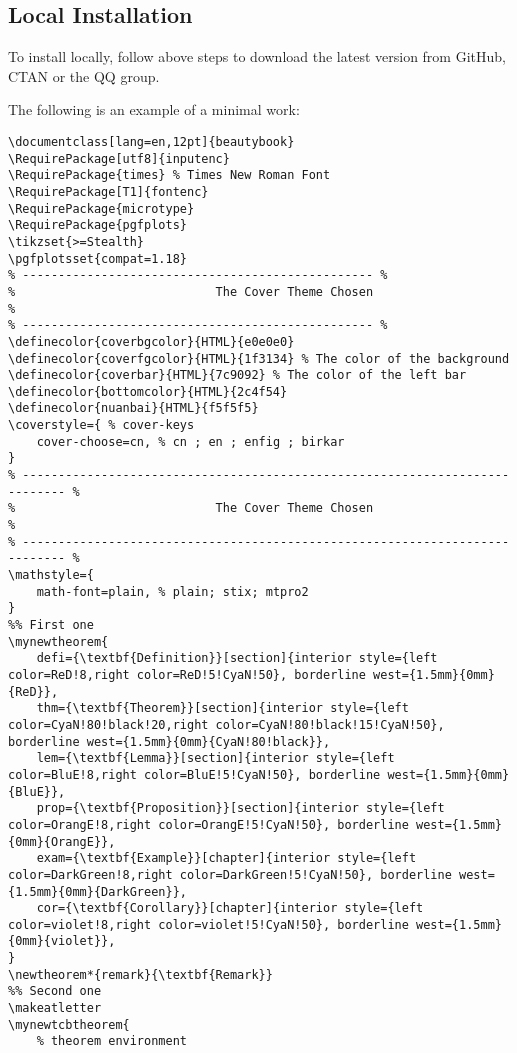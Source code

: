 \documentclass[lang=en,12pt]{beautybook}
\begin{document}
\subsection{Local Installation}

To install locally, follow above steps to download the latest version from GitHub, CTAN or the QQ group.

The following is an example of a minimal work:

\begin{lstlisting}
\documentclass[lang=en,12pt]{beautybook}
\RequirePackage[utf8]{inputenc}
\RequirePackage{times} % Times New Roman Font
\RequirePackage[T1]{fontenc}
\RequirePackage{microtype} 
\RequirePackage{pgfplots}
\tikzset{>=Stealth}
\pgfplotsset{compat=1.18}
% ------------------------------------------------- %
%                            The Cover Theme Chosen                            %
% ------------------------------------------------- %
\definecolor{coverbgcolor}{HTML}{e0e0e0}
\definecolor{coverfgcolor}{HTML}{1f3134} % The color of the background
\definecolor{coverbar}{HTML}{7c9092} % The color of the left bar
\definecolor{bottomcolor}{HTML}{2c4f54}
\definecolor{nuanbai}{HTML}{f5f5f5}
\coverstyle={ % cover-keys
    cover-choose=cn, % cn ; en ; enfig ; birkar
}
% ---------------------------------------------------------------------------- %
%                            The Cover Theme Chosen                            %
% ---------------------------------------------------------------------------- %
\mathstyle={
    math-font=plain, % plain; stix; mtpro2 
}
%% First one
\mynewtheorem{
    defi={\textbf{Definition}}[section]{interior style={left color=ReD!8,right color=ReD!5!CyaN!50}, borderline west={1.5mm}{0mm}{ReD}},
    thm={\textbf{Theorem}}[section]{interior style={left color=CyaN!80!black!20,right color=CyaN!80!black!15!CyaN!50}, borderline west={1.5mm}{0mm}{CyaN!80!black}},
    lem={\textbf{Lemma}}[section]{interior style={left color=BluE!8,right color=BluE!5!CyaN!50}, borderline west={1.5mm}{0mm}{BluE}},
    prop={\textbf{Proposition}}[section]{interior style={left color=OrangE!8,right color=OrangE!5!CyaN!50}, borderline west={1.5mm}{0mm}{OrangE}},
    exam={\textbf{Example}}[chapter]{interior style={left color=DarkGreen!8,right color=DarkGreen!5!CyaN!50}, borderline west={1.5mm}{0mm}{DarkGreen}},
    cor={\textbf{Corollary}}[chapter]{interior style={left color=violet!8,right color=violet!5!CyaN!50}, borderline west={1.5mm}{0mm}{violet}},
}
\newtheorem*{remark}{\textbf{Remark}}
%% Second one
\makeatletter
\mynewtcbtheorem{
    % theorem environment

\end{lstlisting}
\end{document}

